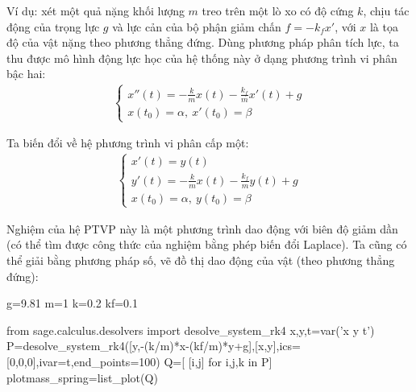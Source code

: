 \documentclass[12pt]{article}
\begin{document}
\newpage{}

Ví dụ: xét một quả nặng khối lượng $m$ treo trên một lò xo có độ cứng $k$, chịu tác động của trọng lực $g$ và lực cản của bộ phận giảm chấn $f=-k_f x'$, với $x$ là tọa độ của vật nặng theo phương thẳng đứng. Dùng phương pháp phân tích lực, ta thu được mô hình động lực học của hệ thống này ở dạng phương trình vi phân bậc hai:
\begin{align*}
 \left\lbrace \begin{array}{l}
               x''(t) = -\frac{k}{m}x(t) - \frac{k_f}{m}x'(t)+g\\
               x(t_0)=\alpha, ~ x'(t_0)=\beta               
              \end{array}
\right.
\end{align*}

Ta biến đổi về hệ phương trình vi phân cấp một:
\begin{align*}
 \left\lbrace \begin{array}{l}
               x'(t) = y(t)\\
               y'(t) = -\frac{k}{m}x(t) - \frac{k_f}{m}y(t)+g\\
               x(t_0)=\alpha, ~ y(t_0)=\beta
              \end{array}
\right.
\end{align*}

\newpage{}

Nghiệm của hệ PTVP này là một phương trình dao động với biên độ giảm dần (có thể tìm được công thức của nghiệm bằng phép biến đổi Laplace). Ta cũng có thể giải bằng phương pháp số, vẽ đồ thị dao động của vật (theo phương thẳng đứng):

\begin{sagesilent}
g=9.81
m=1
k=0.2
kf=0.1

from sage.calculus.desolvers import desolve_system_rk4
x,y,t=var('x y t')
P=desolve_system_rk4([y,-(k/m)*x-(kf/m)*y+g],[x,y],ics=[0,0,0],ivar=t,end_points=100)
Q=[ [i,j] for i,j,k in P]
plotmass_spring=list_plot(Q)
\end{sagesilent}


\label{lastpage}
\end{document}
